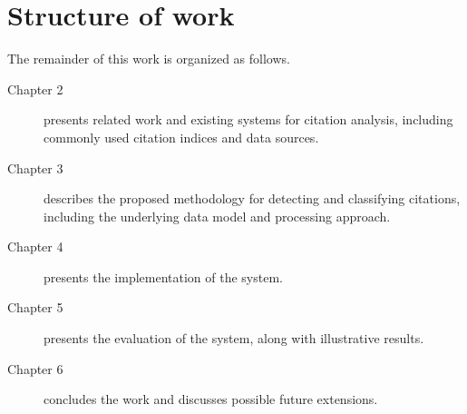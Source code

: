 


\section{Structure of work} \label{sec:structure-of-work}

The remainder of this work is organized as follows.

\begin{description}
\item
[Chapter 2] presents related work and existing systems for citation analysis, including commonly used citation indices and data sources.

\item
[Chapter 3] describes the proposed methodology for detecting and classifying citations, including the underlying data model and processing approach.

\item
[Chapter 4] presents the implementation of the system.

\item
[Chapter 5] presents the evaluation of the system, along with illustrative results.

\item
[Chapter 6] concludes the work and discusses possible future extensions.

\end{description}


